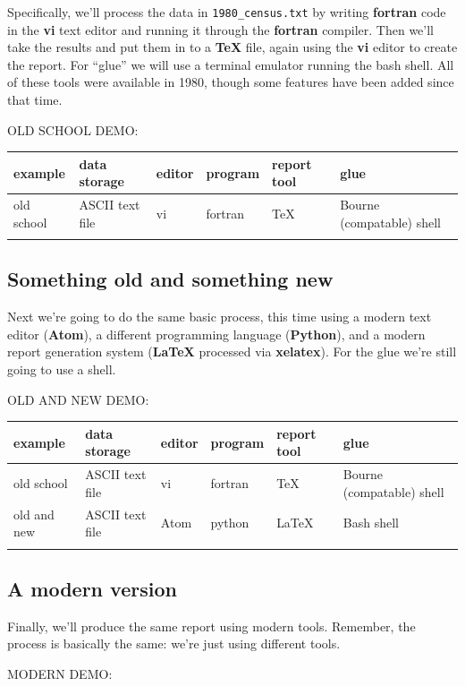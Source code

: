 \documentclass[]{book}
\begin{document}
Specifically, we'll process the data in \texttt{1980\_census.txt} by
writing \textbf{fortran} code in the \textbf{vi} text editor and running
it through the \textbf{fortran} compiler. Then we'll take the results
and put them in to a \textbf{TeX} file, again using the \textbf{vi}
editor to create the report. For ``glue'' we will use a terminal
emulator running the bash shell. All of these tools were available in
1980, though some features have been added since that time.

OLD SCHOOL DEMO:

\begin{longtable}[]{@{}llllll@{}}
\toprule
example & data storage & editor & program & report tool &
glue\tabularnewline
\midrule
\endhead
old school & ASCII text file & vi & fortran & TeX & Bourne (compatable)
shell\tabularnewline
& & & & &\tabularnewline
\bottomrule
\end{longtable}

\subsection{Something old and something
new}\label{something-old-and-something-new}

Next we're going to do the same basic process, this time using a modern
text editor (\textbf{Atom}), a different programming language
(\textbf{Python}), and a modern report generation system (\textbf{LaTeX}
processed via \textbf{xelatex}). For the glue we're still going to use a
shell.

OLD AND NEW DEMO:

\begin{longtable}[]{@{}llllll@{}}
\toprule
example & data storage & editor & program & report tool &
glue\tabularnewline
\midrule
\endhead
old school & ASCII text file & vi & fortran & TeX & Bourne (compatable)
shell\tabularnewline
old and new & ASCII text file & Atom & python & LaTeX & Bash
shell\tabularnewline
& & & & &\tabularnewline
\bottomrule
\end{longtable}

\subsection{A modern version}\label{a-modern-version}

Finally, we'll produce the same report using modern tools. Remember, the
process is basically the same: we're just using different tools.

MODERN DEMO:
\end{document}
